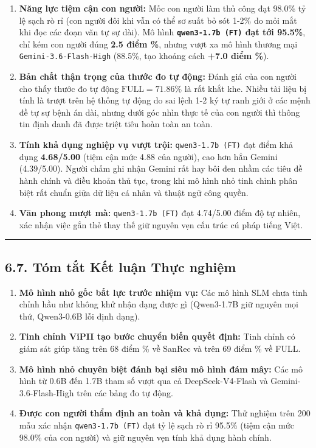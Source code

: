 \documentclass[
  11pt,
  a4paper,
]{article}
\providecommand{\tightlist}{%
  \setlength{\itemsep}{0pt}\setlength{\parskip}{0pt}}
\begin{document}
\begin{enumerate}
\def\labelenumi{\arabic{enumi}.}
\tightlist
\item
  \textbf{Năng lực tiệm cận con người:} Mốc con người làm thủ công đạt 98.0\% tỷ lệ sạch rò rỉ (con
  người đôi khi vẫn có thể sơ suất bỏ sót 1-2\% do mỏi mắt khi đọc các đoạn văn tự sự dài). Mô hình
  \textbf{\texttt{qwen3-1.7b\ (FT)} đạt tới 95.5\%}, chỉ kém con người đúng \textbf{2.5 điểm \%},
  nhưng vượt xa mô hình thương mại \texttt{Gemini-3.6-Flash-High} (88.5\%, tạo khoảng cách
  \textbf{+7.0 điểm \%}).
\item
  \textbf{Bản chất thận trọng của thước đo tự động:} Đánh giá của con người cho thấy thước đo tự
  động \(\text{FULL} = 71.86\%\) là rất khắt khe. Nhiều tài liệu bị tính là trượt trên hệ thống tự
  động do sai lệch 1-2 ký tự ranh giới ở các mệnh đề tự sự bệnh án dài, nhưng dưới góc nhìn thực tế
  của con người thì thông tin định danh đã được triệt tiêu hoàn toàn an toàn.
\item
  \textbf{Tính khả dụng nghiệp vụ vượt trội:} \texttt{qwen3-1.7b\ (FT)} đạt điểm khả dụng
  \textbf{4.68/5.00} (tiệm cận mức 4.88 của người), cao hơn hẳn Gemini (4.39/5.00). Người chấm ghi
  nhận Gemini rất hay bôi đen nhầm các tiêu đề hành chính và điều khoản thủ tục, trong khi mô hình
  nhỏ tinh chỉnh phân biệt rất chuẩn giữa dữ liệu cá nhân và thuật ngữ công quyền.
\item
  \textbf{Văn phong mượt mà:} \texttt{qwen3-1.7b\ (FT)} đạt 4.74/5.00 điểm độ tự nhiên, xác nhận
  việc gắn thẻ thay thế giữ nguyên vẹn cấu trúc cú pháp tiếng Việt.
\end{enumerate}

\begin{center}\rule{0.5\linewidth}{0.5pt}\end{center}

\subsection{6.7. Tóm tắt Kết luận Thực
nghiệm}\label{tuxf3m-tux1eaft-kux1ebft-luux1eadn-thux1ef1c-nghiux1ec7m}

\begin{enumerate}
\def\labelenumi{\arabic{enumi}.}
\tightlist
\item
  \textbf{Mô hình nhỏ gốc bất lực trước nhiệm vụ:} Các mô hình SLM chưa tinh chỉnh hầu như không khử
  nhận dạng được gì (Qwen3-1.7B giữ nguyên mọi thứ, Qwen3-0.6B lỗi định dạng).
\item
  \textbf{Tinh chỉnh ViPII tạo bước chuyển biến quyết định:} Tinh chỉnh có giám sát giúp tăng trên
  68 điểm \% về SanRec và trên 69 điểm \% về FULL.
\item
  \textbf{Mô hình nhỏ chuyên biệt đánh bại siêu mô hình đám mây:} Các mô hình từ 0.6B đến 1.7B tham
  số vượt qua cả DeepSeek-V4-Flash và Gemini-3.6-Flash-High trên các bảng đo tự động.
\item
  \textbf{Được con người thẩm định an toàn và khả dụng:} Thử nghiệm trên 200 mẫu xác nhận
  \texttt{qwen3-1.7b\ (FT)} đạt tỷ lệ sạch rò rỉ 95.5\% (tiệm cận mức 98.0\% của con người) và giữ
  nguyên vẹn tính khả dụng hành chính.
\end{enumerate}
\end{document}
